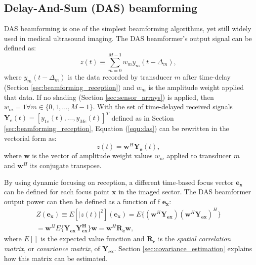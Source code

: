 \subsection{Delay-And-Sum (DAS) beamforming}
\label{sec:DAS}
DAS beamforming is one of the simplest beamforming algorithms, yet still widely used in medical ultrasound imaging. The DAS beamformer's output signal can be defined as:
\begin{equation}
    z(t) \equiv \sum_{m=0}^{M-1} w_m y_m(t - \Delta_m),
\label{equ:das}
\end{equation}
\noindent
where $y_m(t - \Delta_m)$ is the data recorded by transducer $m$ after time-delay (Section \ref{sec:beamforming_reception}) and $w_m$ is the amplitude weight applied that data. If no shading (Section \ref{sec:sensor_arrays}) is applied, then $w_m = 1 \forall m \in \{0, 1, ..., M-1\}$. 
With the set of time-delayed received signals $\boldsymbol{Y}_e(t) = [y_{1e}(t), ..., y_{Me}(t)]^T$ defined as in Section \ref{sec:beamforming_reception}, Equation (\ref{equ:das}) can be rewritten in the vectorial form as:
\begin{equation}
    z(t) = \boldsymbol{w}^H \boldsymbol{Y_e}(t),
\end{equation}
\noindent
where $\boldsymbol{w}$ is the vector of amplitude weight values $w_m$ applied to transducer $m$ and $\boldsymbol{w}^H$ its conjugate transpose.

By using dynamic focusing on reception, a different time-based focus vector $\boldsymbol{e_x}$ can be defined for each focus point $\boldsymbol{x}$ in the imaged sector. 
The DAS beamformer output power can then be defined as a function of f $\boldsymbol{e_x}$:
\begin{equation}
\begin{split}
    Z(\boldsymbol{e_x}) \equiv E[|z(t)|^2](\boldsymbol{e_x}) = E\{(\boldsymbol{w}^H \boldsymbol{Y_{ex}})(\boldsymbol{w}^H \boldsymbol{Y_{ex}})^H\} \\
    = \boldsymbol{w}^H E\{\boldsymbol{Y_{ex}} \boldsymbol{Y_{ex}^H} \} \boldsymbol{w} = \boldsymbol{w}^H \boldsymbol{R_e} \boldsymbol{w},
\end{split}
\label{eq:das_power}
\end{equation}
\noindent
where $E[]$ is the expected value function and $\boldsymbol{R_e}$ is the \textit{spatial correlation matrix}, or \textit{covariance matrix}, of $\boldsymbol{Y_{ex}}$. Section \ref{sec:covariance_estimation} explains how this matrix can be estimated.

